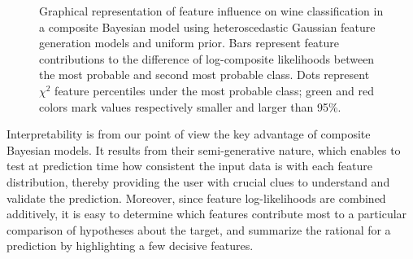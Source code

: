 \documentclass[english]{scrartcl}
\begin{document}
\begin{figure}[!ht]
\begin{center}
\end{center}
\caption{Graphical representation of feature influence on wine classification in a composite Bayesian model using heteroscedastic Gaussian feature generation models and uniform prior. Bars represent feature contributions to the difference of log-composite likelihoods between the most probable and second most probable class. Dots represent $\chi^2$ feature percentiles under the most probable class; green and red colors mark values respectively smaller and larger than 95\%.}
\label{fig:interp}
\end{figure}

Interpretability is from our point of view the key advantage of composite Bayesian models. It results from their semi-generative nature, which enables to test at prediction time how consistent the input data is with each feature distribution, thereby providing the user with crucial clues to understand and validate the prediction. Moreover, since feature log-likelihoods are combined additively, it is easy to determine which features contribute most to a particular comparison of hypotheses about the target, and summarize the rational for a prediction by highlighting a few decisive features. 
\end{document}
